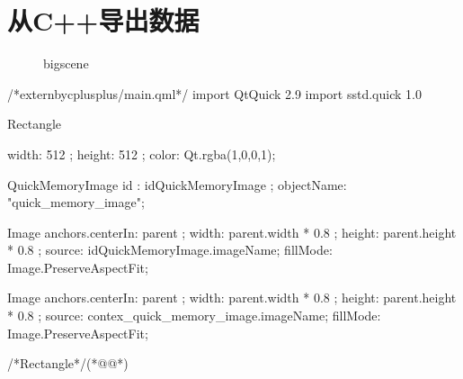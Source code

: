 ﻿




\FloatBarrier
\section{
从C{\sourcefonttwo{}+}{\sourcefonttwo{}+}导出数据
}\label{s100810t01}


\begin{figure}[htb] %
\marginnote{\setlength\fboxsep{2pt}\fbox{\footnotesize{\kaishu\figurename\,}\footnotesize{\ref{p000064}}}}\centering %
\setlength\fboxsep{0pt} %
\caption{bigscene} %
\label{p000064} %
\end{figure}


\label{f000081}    %
\FloatBarrier                                  %
\begin{thebookfilesourceone}[escapeinside={(*@}{@*)},
caption=GoodLuck,
title=\filesourcenumbernameone \thefilesourcenumber
]
/*externbycplusplus/main.qml*/
import QtQuick 2.9
import sstd.quick 1.0

Rectangle{

    width: 512 ;
    height: 512 ;
    color: Qt.rgba(1,0,0,1);

    QuickMemoryImage{
        id : idQuickMemoryImage ;
        objectName: "quick_memory_image";
    }

    Image {
        anchors.centerIn: parent ;
        width: parent.width * 0.8 ;
        height: parent.height * 0.8 ;
        source: idQuickMemoryImage.imageName;
        fillMode: Image.PreserveAspectFit;
    }

    Image {
        anchors.centerIn: parent ;
        width: parent.width * 0.8 ;
        height: parent.height * 0.8 ;
        source: contex_quick_memory_image.imageName;
        fillMode: Image.PreserveAspectFit;
    }

}/*Rectangle*/(*@\marginpar[\hfill\setlength\fboxsep{2pt}\fbox{\footnotesize{\kaishu\parbox{1em}{\setlength{\baselineskip}{2pt}\filesourcenumbernameone}}\footnotesize{\thefilesourcenumber}}]{\setlength\fboxsep{2pt}\fbox{\footnotesize{\kaishu\parbox{1em}{\setlength{\baselineskip}{2pt}\filesourcenumbernameone}}\footnotesize{\thefilesourcenumber}}}@*)\end{thebookfilesourceone}          %
\addtocounter{lstlisting}{-1}   %




